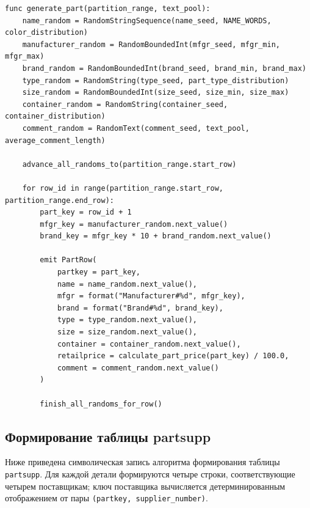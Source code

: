 \begin{lstlisting}[caption={Формирование таблицы part}]
func generate_part(partition_range, text_pool):
    name_random = RandomStringSequence(name_seed, NAME_WORDS, color_distribution)
    manufacturer_random = RandomBoundedInt(mfgr_seed, mfgr_min, mfgr_max)
    brand_random = RandomBoundedInt(brand_seed, brand_min, brand_max)
    type_random = RandomString(type_seed, part_type_distribution)
    size_random = RandomBoundedInt(size_seed, size_min, size_max)
    container_random = RandomString(container_seed, container_distribution)
    comment_random = RandomText(comment_seed, text_pool, average_comment_length)

    advance_all_randoms_to(partition_range.start_row)

    for row_id in range(partition_range.start_row, partition_range.end_row):
        part_key = row_id + 1
        mfgr_key = manufacturer_random.next_value()
        brand_key = mfgr_key * 10 + brand_random.next_value()

        emit PartRow(
            partkey = part_key,
            name = name_random.next_value(),
            mfgr = format("Manufacturer#%d", mfgr_key),
            brand = format("Brand#%d", brand_key),
            type = type_random.next_value(),
            size = size_random.next_value(),
            container = container_random.next_value(),
            retailprice = calculate_part_price(part_key) / 100.0,
            comment = comment_random.next_value()
        )

        finish_all_randoms_for_row()
\end{lstlisting}

\subsection{Формирование таблицы partsupp}

Ниже приведена символическая запись алгоритма формирования таблицы
\texttt{partsupp}. Для каждой детали формируются четыре строки, соответствующие
четырем поставщикам; ключ поставщика вычисляется детерминированным отображением
от пары \texttt{(partkey, supplier\_number)}.

